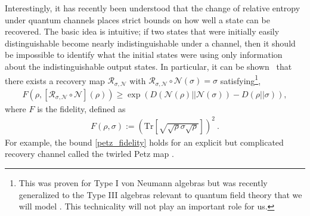 \documentclass[a4paper,11pt]{article}
\newcommand\sig{\sigma}
\newcommand\sN{{\ensuremath{{\mathcal N}}}}
\newcommand\sR{{\mathcal R}}
\newcommand{\Tr}{\text{Tr}}
\begin{document}
Interestingly, it has recently been understood that the change of relative entropy under quantum channels places strict bounds on how well a state can be recovered. The basic idea is intuitive; if two states that were initially easily distinguishable become nearly indistinguishable under a channel, then it should be impossible to identify what the initial states were using only information about the indistinguishable output states. In particular, it can be shown~\cite{2015arXiv150907127J} that there exists a recovery map $\sR_{\sig, \sN}$ with $\mathcal{R}_{\sigma,\mathcal{N}}\circ \mathcal{N} (\sigma) = \sigma$ satisfying\footnote{This was proven for Type I von Neumann algebras but was recently generalized to the Type III algebras relevant to quantum field theory that we will model \cite{2020arXiv200608002F}. This technicality will not play an important role for us.}, 
\begin{align}
 F(\rho, [\mathcal{R}_{\sigma,\mathcal{N}}\circ \mathcal{N}](\rho)) \geq \exp (D(\mathcal{N}(\rho) || 
 \mathcal{N}(\sigma) ) - D(\rho|| \sigma) ),
 \label{petz_fidelity}
\end{align}
where $F$ is the fidelity, defined as 
\begin{align}
 F(\rho, \sig) := \left(\Tr \left[ \sqrt{\sqrt{\rho} \sigma \sqrt{\rho}}\right]\right)^2 \ .
\end{align}
For example, the bound \eqref{petz_fidelity} holds for an explicit but complicated recovery channel called the twirled Petz map \cite{2015arXiv150907127J}.
\end{document}
